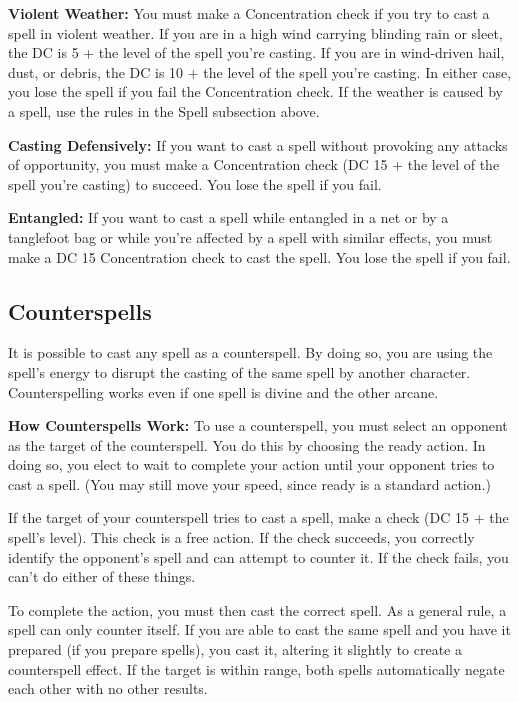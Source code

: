\textbf{Violent Weather:} You must make a Concentration check if you try to cast 
a spell in violent weather. If you are in a high wind carrying blinding rain or 
sleet, the DC is 5 + the level of the spell you're casting. If you are in wind-driven 
hail, dust, or debris, the DC is 10 + the level of the spell you're casting. In 
either case, you lose the spell if you fail the Concentration check. If the weather 
is caused by a spell, use the rules in the Spell subsection above.

\textbf{Casting Defensively:} If you want to cast a spell without provoking any 
attacks of opportunity, you must make a Concentration check (DC 15 + the level 
of the spell you're casting) to succeed. You lose the spell if you fail.

\textbf{Entangled:} If you want to cast a spell while entangled in a net or by 
a tanglefoot bag or while you're affected by a spell with similar effects, you 
must make a DC 15 Concentration check to cast the spell. You lose the spell if 
you fail.

\subsection{Counterspells}

It is possible to cast any spell as a counterspell. By doing so, you are using 
the spell's energy to disrupt the casting of the same spell by another character. 
Counterspelling works even if one spell is divine and the other arcane.

\textbf{How Counterspells Work:} To use a counterspell, you must select an opponent 
as the target of the counterspell. You do this by choosing the ready action. In 
doing so, you elect to wait to complete your action until your opponent tries to 
cast a spell. (You may still move your speed, since ready is a standard action.)

If the target of your counterspell tries to cast a spell, make a  check 
(DC 15 + the spell's level). This check is a free action. If the check succeeds, 
you correctly identify the opponent's spell and can attempt to counter it. If the 
check fails, you can't do either of these things.

To complete the action, you must then cast the correct spell. As a general rule, 
a spell can only counter itself. If you are able to cast the same spell and you 
have it prepared (if you prepare spells), you cast it, altering it slightly to 
create a counterspell effect. If the target is within range, both spells automatically 
negate each other with no other results.

